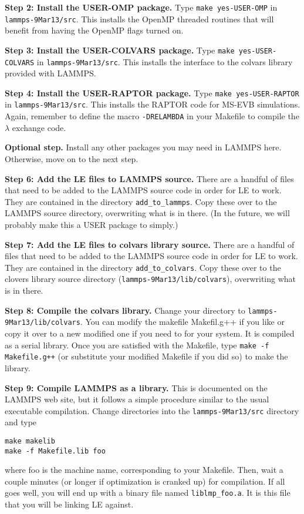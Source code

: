 \documentclass[10pt]{article}
\begin{document}
\textbf{Step 2: Install the USER-OMP package.}
Type \texttt{make yes-USER-OMP} in \texttt{lammps-9Mar13/src}. This installs the OpenMP
threaded routines that will benefit from having the OpenMP flags turned on.

\textbf{Step 3: Install the USER-COLVARS package.}
Type \texttt{make yes-USER-COLVARS} in \texttt{lammps-9Mar13/src}. This installs the
interface to the colvars library provided with LAMMPS.

\textbf{Step 4: Install the USER-RAPTOR package.}
Type \texttt{make yes-USER-RAPTOR} in \texttt{lammps-9Mar13/src}. This installs the
RAPTOR code for MS-EVB simulations. Again, remember to define the macro \texttt{-DRELAMBDA} in your
Makefile to compile the $\lambda$ exchange code.

\textbf{Optional step.} Install any other packages you may need in LAMMPS here. Otherwise, move on to the next step.

\textbf{Step 6: Add the LE files to LAMMPS source.}
There are a handful of files that need to be added to the LAMMPS source code in order
for LE to work. They are contained in the directory \texttt{add\_to\_lammps}. Copy these
over to the LAMMPS source directory, overwriting what is in there. (In the future, we
will probably make this a USER package to simply.)

\textbf{Step 7: Add the LE files to colvars library source.}
There are a handful of files that need to be added to the LAMMPS source code in order
for LE to work. They are contained in the directory \texttt{add\_to\_colvars}. Copy these
over to the clovers library source directory (\texttt{lammps-9Mar13/lib/colvars}), 
overwriting what is in there.

\textbf{Step 8: Compile the colvars library.}
Change your directory to \texttt{lammps-9Mar13/lib/colvars}. You can modify the
makefile Makefil.g++ if you like or copy it over to a new modified one if you 
need to for your system. It is compiled as a serial library. Once you are satisfied
with the Makefile, type \texttt{make -f Makefile.g++} (or substitute your modified Makefile if
you did so) to make the library.

\textbf{Step 9: Compile LAMMPS as a library.}
This is documented on the LAMMPS web site, but it follows
a simple procedure similar to the usual executable compilation. Change directories into
the \texttt{lammps-9Mar13/src} directory and type
\begin{verbatim}
make makelib
make -f Makefile.lib foo
\end{verbatim}
where foo is the machine name, corresponding to your Makefile. Then, wait a couple minutes
(or longer if optimization is cranked up) for compilation. If all goes well, you will
end up with a binary file named \texttt{liblmp\_foo.a}. It is this file that you will be
linking LE against.
\end{document}
